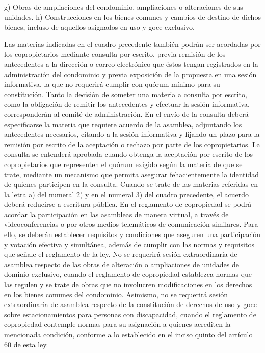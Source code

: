               g) Obras de
              ampliaciones
              del condominio,
              ampliaciones o
              alteraciones
              de sus unidades.
              h) Construcciones
              en los bienes
              comunes y
              cambios de
              destino de
              dichos bienes,
              incluso de
              aquellos
              asignados
              en uso y
              goce exclusivo.   

    
     
    Las materias indicadas en el cuadro precedente también podrán ser acordadas por los copropietarios mediante consulta por escrito, previa remisión de los antecedentes a la dirección o correo electrónico que éstos tengan registrados en la administración del condominio y previa exposición de la propuesta en una sesión informativa, la que no requerirá cumplir con quórum mínimo para su constitución. Tanto la decisión de someter una materia a consulta por escrito, como la obligación de remitir los antecedentes y efectuar la sesión informativa, corresponderán al comité de administración. En el envío de la consulta deberá especificarse la materia que requiere acuerdo de la asamblea, adjuntando los antecedentes necesarios, citando a la sesión informativa y fijando un plazo para la remisión por escrito de la aceptación o rechazo por parte de los copropietarios.
    La consulta se entenderá aprobada cuando obtenga la aceptación por escrito de los copropietarios que representen el quórum exigido según la materia de que se trate, mediante un mecanismo que permita asegurar fehacientemente la identidad de quienes participen en la consulta. Cuando se trate de las materias referidas en la letra a) del numeral 2) y en el numeral 3) del cuadro precedente, el acuerdo deberá reducirse a escritura pública.
    En el reglamento de copropiedad se podrá acordar la participación en las asambleas de manera virtual, a través de videoconferencias o por otros medios telemáticos de comunicación similares. Para ello, se deberán establecer requisitos y condiciones que aseguren una participación y votación efectiva y simultánea, además de cumplir con las normas y requisitos que señale el reglamento de la ley.
    No se requerirá sesión extraordinaria de asamblea respecto de las obras de alteración o ampliaciones de unidades de dominio exclusivo, cuando el reglamento de copropiedad establezca normas que las regulen y se trate de obras que no involucren modificaciones en los derechos en los bienes comunes del condominio. Asimismo, no se requerirá sesión extraordinaria de asamblea respecto de la constitución de derechos de uso y goce sobre estacionamientos para personas con discapacidad, cuando el reglamento de copropiedad contemple normas para su asignación a quienes acrediten la mencionada condición, conforme a lo establecido en el inciso quinto del artículo 60 de esta ley.

